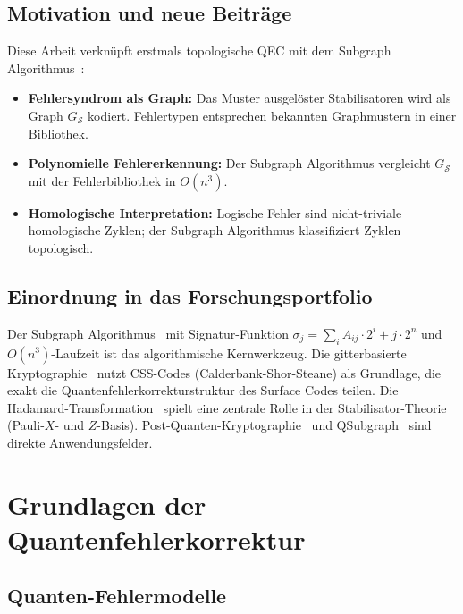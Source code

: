 ﻿\documentclass[a4paper,12pt]{article}
\theoremstyle{definition}
\begin{document}
\subsection{Motivation und neue Beitr\"age}

Diese Arbeit verkn\"upft erstmals topologische QEC mit dem
Subgraph Algorithmus~\cite{epp2026subgraph}:
\begin{itemize}
    \item \textbf{Fehlersyndrom als Graph:} Das Muster ausgelöster
          Stabilisatoren wird als Graph $G_{\mathcal{S}}$ kodiert.
          Fehlertypen entsprechen bekannten Graphmustern in einer Bibliothek.
    \item \textbf{Polynomielle Fehlererkennung:} Der Subgraph Algorithmus
          vergleicht $G_{\mathcal{S}}$ mit der Fehlerbibliothek in $O(n^3)$.
    \item \textbf{Homologische Interpretation:} Logische Fehler sind
          nicht-triviale homologische Zyklen; der Subgraph Algorithmus
          klassifiziert Zyklen topologisch.
\end{itemize}

\subsection{Einordnung in das Forschungsportfolio}

Der Subgraph Algorithmus~\cite{epp2026subgraph} mit Signatur-Funktion
$\sigma_j = \sum_i A_{ij} \cdot 2^i + j \cdot 2^n$ und $O(n^3)$-Laufzeit
ist das algorithmische Kernwerkzeug.
Die gitterbasierte Kryptographie~\cite{epp2026lattice} nutzt CSS-Codes
(Calderbank-Shor-Steane) als Grundlage, die exakt die Quantenfehlerkorrekturstruktur
des Surface Codes teilen.
Die Hadamard-Transformation~\cite{epp2026hadamard} spielt eine zentrale Rolle
in der Stabilisator-Theorie (Pauli-$X$- und $Z$-Basis).
Post-Quanten-Kryptographie~\cite{epp2026pqc} und QSubgraph~\cite{epp2026qsubgraph}
sind direkte Anwendungsfelder.

\section{Grundlagen der Quantenfehlerkorrektur}

\subsection{Quanten-Fehlermodelle}
\end{document}
